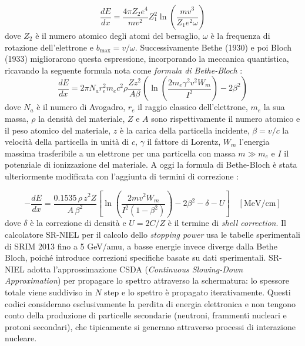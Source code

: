 \documentclass[12pt]{report}
\begin{document}
\begin{equation}
    \frac{dE}{dx} = \frac{4\pi Z_2 e^4}{mv^2}Z_1^2 \ln(\frac{mv^3}{Z_1 e^2 \omega})
\end{equation}
dove $Z_2$ è il numero atomico degli atomi del bersaglio, $\omega$ è la frequenza di rotazione dell'elettrone e $b_{\max} = v/{\omega}$.
Successivamente Bethe (1930) \cite{Bethe} e poi Bloch (1933) migliorarono questa espressione, incorporando la meccanica quantistica, ricavando la seguente formula nota come \textit{formula di Bethe-Bloch} \cite{Leroy_principles_of_radiation}:
\vspace{-5pt}
\begin{equation}
    \frac{dE}{dx} = 2\pi N_a r_e^2 m_e c^2 \rho \frac{Z z^2}{A \beta} \left(\ln\left(\frac{2m_e\gamma^2v^2W_m}{I^2}\right)-2\beta^2\right)
\end{equation}
dove $N_a$ è il numero di Avogadro, $r_e$ il raggio classico dell'elettrone, $m_e$ la sua massa, $\rho$ la densità del materiale, $Z$ e $A$ sono rispettivamente il numero atomico e il peso atomico del materiale, $z$ è la carica della particella incidente, $\beta=v/c$ la velocità della particella in unità di $c$, $\gamma$ il fattore di Lorentz, $W_m$ l'energia massima trasferibile a un elettrone per una particella con massa $m \gg m_e$ e $I$ il potenziale di ionizzazione del materiale. A oggi la formula di Bethe-Bloch è stata ulteriormente modificata con l'aggiunta di termini di correzione \cite{Leroy_principles_of_radiation}:

\begin{equation}
    -\frac{dE}{dx} = \frac{0.1535 \, \rho \, z^2 Z}{A \, \beta^2} \left[ \ln\!\left(\frac{2m v^2 W_m}{I^2(1-\beta^2)}\right) - 2\beta^2 - \delta - U \right] \quad [\text{MeV/cm}]
    \label{eq:bethe_bloch}
\end{equation}
dove $\delta$ è la correzione di densità e $U=2C/Z$ è il termine di \textit{shell correction}. Il calcolatore SR-NIEL per il calcolo dello \textit{stopping power} usa le tabelle sperimentali di SRIM 2013 \cite{srim_tutorials} fino a 5 GeV/amu, a basse energie invece diverge dalla Bethe Bloch, poiché introduce correzioni specifiche basate su dati sperimentali. SR-NIEL adotta l'approssimazione CSDA \cite{nist_star_appendix} (\textit{Continuous Slowing-Down Approximation}) per propagare lo spettro attraverso la schermatura: lo spessore totale viene suddiviso in $N$ step e lo spettro è propagato iterativamente. Questi codici considerano esclusivamente la perdita di energia elettronica e non tengono conto della produzione di particelle secondarie (neutroni, frammenti nucleari e protoni secondari), che tipicamente si generano attraverso processi di interazione nucleare.
\vspace{-10pt}
\end{document}
